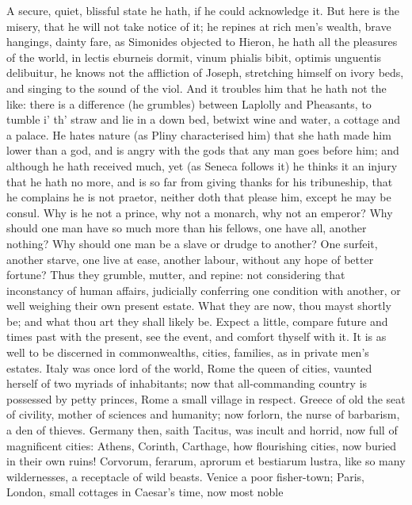 {A secure, quiet, blissful state he hath, if he could acknowledge it.
But here is the misery, that he will not take notice of it; he repines
at rich men's wealth, brave hangings, dainty fare, as Simonides
objected to Hieron, he hath all the pleasures of the world, in
lectis eburneis dormit, vinum phialis bibit, optimis unguentis
delibuitur, he knows not the affliction of Joseph, stretching himself
on ivory beds, and singing to the sound of the viol. And it troubles
him that he hath not the like: there is a difference (he grumbles)
between Laplolly and Pheasants, to tumble i' th' straw and lie in a
down bed, betwixt wine and water, a cottage and a palace. He hates
nature (as Pliny characterised him) that she hath made him lower
than a god, and is angry with the gods that any man goes before him;
and although he hath received much, yet (as Seneca follows it) he
thinks it an injury that he hath no more, and is so far from giving
thanks for his tribuneship, that he complains he is not praetor,
neither doth that please him, except he may be consul. Why is he not a
prince, why not a monarch, why not an emperor? Why should one man have
so much more than his fellows, one have all, another nothing? Why
should one man be a slave or drudge to another? One surfeit, another
starve, one live at ease, another labour, without any hope of better
fortune? Thus they grumble, mutter, and repine: not considering that
inconstancy of human affairs, judicially conferring one condition with
another, or well weighing their own present estate. What they are now,
thou mayst shortly be; and what thou art they shall likely be. Expect a
little, compare future and times past with the present, see the event,
and comfort thyself with it. It is as well to be discerned in
commonwealths, cities, families, as in private men's estates. Italy was
once lord of the world, Rome the queen of cities, vaunted herself of
two myriads of inhabitants; now that all-commanding country is
possessed by petty princes, Rome a small village in respect.
Greece of old the seat of civility, mother of sciences and humanity;
now forlorn, the nurse of barbarism, a den of thieves. Germany then,
saith Tacitus, was incult and horrid, now full of magnificent cities:
Athens, Corinth, Carthage, how flourishing cities, now buried in their
own ruins! Corvorum, ferarum, aprorum et bestiarum lustra, like so many
wildernesses, a receptacle of wild beasts. Venice a poor fisher-town;
Paris, London, small cottages in Caesar's time, now most noble
}
